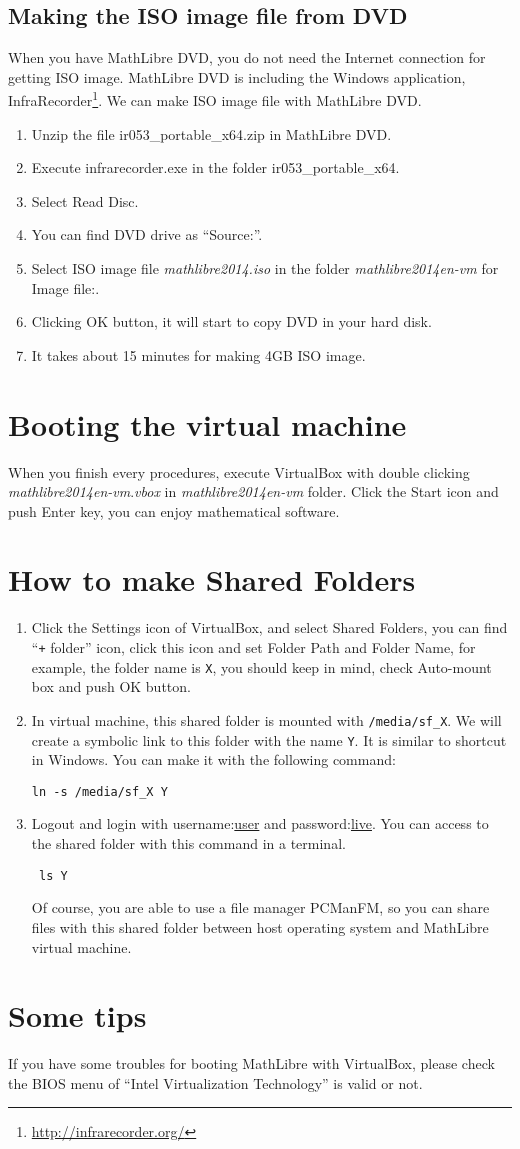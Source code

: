 \documentclass[a4,twocolumn]{article}
\newcommand{\ir}{ir053\_portable\_x64}
\newcommand{\vm}{{\em mathlibre2014en-vm}}
\begin{document}
\subsection{Making the ISO image file from DVD}
When you have MathLibre DVD, 
you do not need the Internet connection for getting ISO image.
MathLibre DVD is including the Windows application, InfraRecorder\footnote{\url{http://infrarecorder.org/}}.
We can make ISO image file with MathLibre DVD.
\begin{enumerate}
 \item Unzip the file \ir.zip{} in MathLibre DVD.
 \item Execute infrarecorder.exe in the folder \ir.
 \item Select Read Disc.
 \item You can find DVD drive as ``Source:''.
 \item Select ISO image file {\em mathlibre2014.iso} in the folder \vm{} for Image file:.
 \item Clicking OK button, it will start to copy DVD in your hard disk.
 \item It takes about 15 minutes for making 4GB ISO image.
\end{enumerate}

\section{Booting the virtual machine}
When you finish every procedures,
execute VirtualBox with double clicking \vm.{\em vbox} in \vm{} folder.
Click the Start icon and push Enter key, you can enjoy mathematical software.

\section{How to make Shared Folders}
\begin{enumerate}
 \item Click the Settings icon of VirtualBox,
       and select Shared Folders, you can find
       ``\verb|+| folder'' icon, click this icon and set Folder Path and
       Folder Name, for example, the folder name is \verb|X|,
       you should keep in mind, check Auto-mount box and push OK button.
 \item  In virtual machine, this shared folder is mounted with
	\verb|/media/sf_X|. We will create a symbolic link to this folder with
	the name \verb|Y|. It is similar to shortcut in Windows. You can make
	it with the following command:
\begin{lstlisting}
ln -s /media/sf_X Y
\end{lstlisting}
\item Logout and login with username:\underline{user} and password:\underline{live}. You can access to the shared folder with this command in a terminal. 
\begin{lstlisting}
 ls Y
\end{lstlisting}
Of course, you are able to use a file manager PCManFM, so you can share
files with this shared folder between host operating system and
      MathLibre virtual machine.
\end{enumerate}
\section{Some tips}
If you have some troubles for booting MathLibre with VirtualBox,
please check the BIOS menu of ``Intel Virtualization Technology'' is
valid or not. 
\end{document}
